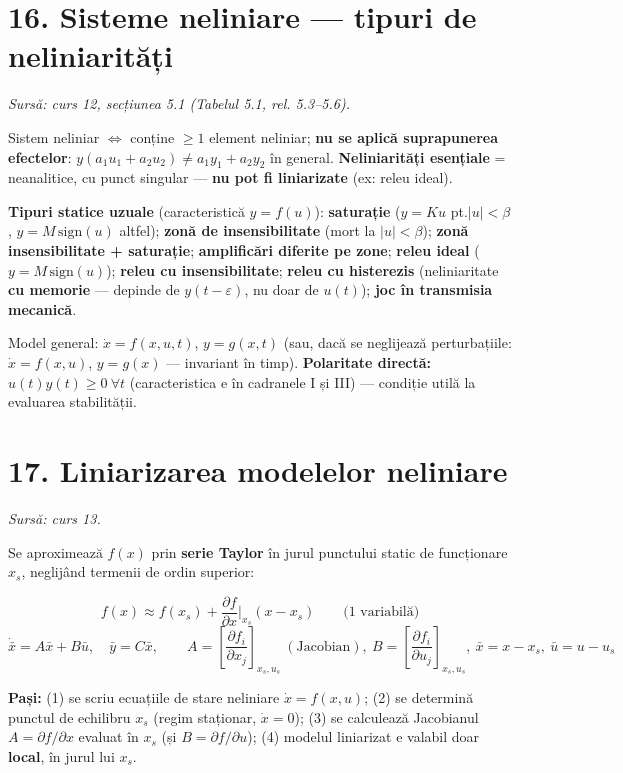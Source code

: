\documentclass[10pt,a4paper]{article}
\newcommand{\srcnote}[1]{{\footnotesize\color{gray!55!black}\textit{Sursă: #1}}\par}
\begin{document}
\section*{16. Sisteme neliniare — tipuri de neliniarități}\label{sec:16}
\srcnote{curs 12, secțiunea 5.1 (Tabelul 5.1, rel. 5.3–5.6).}
Sistem neliniar $\iff$ conține $\ge1$ element neliniar; \textbf{nu se aplică suprapunerea efectelor}: $y(a_1u_1+a_2u_2)\ne a_1y_1+a_2y_2$ în general. \textbf{Neliniarități esențiale} = neanalitice, cu punct singular — \textbf{nu pot fi liniarizate} (ex: releu ideal).
\begin{keyeq}\color{red!65!black}
\textbf{Tipuri statice uzuale} (caracteristică $y=f(u)$): \textbf{saturație} ($y{=}Ku$ pt.$|u|{<}\beta$, $y{=}M\,\mathrm{sign}(u)$ altfel); \textbf{zonă de insensibilitate} (mort la $|u|{<}\beta$); \textbf{zonă insensibilitate + saturație}; \textbf{amplificări diferite pe zone}; \textbf{releu ideal} ($y=M\,\mathrm{sign}(u)$); \textbf{releu cu insensibilitate}; \textbf{releu cu histerezis} (neliniaritate \textbf{cu memorie} — depinde de $y(t-\varepsilon)$, nu doar de $u(t)$); \textbf{joc în transmisia mecanică}.
\end{keyeq}
Model general: $\dot x=f(x,u,t)$, $y=g(x,t)$ (sau, dacă se neglijează perturbațiile: $\dot x=f(x,u)$, $y=g(x)$ — invariant în timp). \textbf{Polaritate directă:} $u(t)y(t)\ge0\ \forall t$ (caracteristica e în cadranele I și III) — condiție utilă la evaluarea stabilității.

\section*{17. Liniarizarea modelelor neliniare}\label{sec:17}
\srcnote{curs 13.}
Se aproximează $f(x)$ prin \textbf{serie Taylor} în jurul punctului static de funcționare $x_s$, neglijând termenii de ordin superior:
\begin{keyeq}\color{red!65!black}
$$f(x)\approx f(x_s)+\dfrac{\partial f}{\partial x}\bigg|_{x_s}(x-x_s)\qquad\text{(1 variabilă)}$$
$$\dot{\bar x}=A\bar x+B\bar u,\quad \bar y=C\bar x,\qquad A=\left[\dfrac{\partial f_i}{\partial x_j}\right]_{x_s,u_s}\ (\text{Jacobian}),\ B=\left[\dfrac{\partial f_i}{\partial u_j}\right]_{x_s,u_s},\ \bar x=x-x_s,\ \bar u=u-u_s$$
\end{keyeq}
\textbf{Pași:} (1) se scriu ecuațiile de stare neliniare $\dot x=f(x,u)$; (2) se determină punctul de echilibru $x_s$ (regim staționar, $\dot x=0$); (3) se calculează Jacobianul $A=\partial f/\partial x$ evaluat în $x_s$ (și $B=\partial f/\partial u$); (4) modelul liniarizat e valabil doar \textbf{local}, în jurul lui $x_s$.
\end{document}
